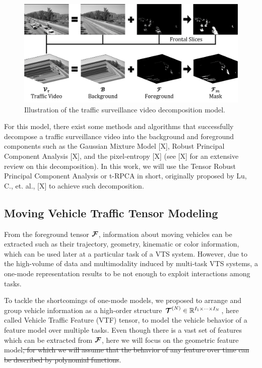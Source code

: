 \documentclass[sensors,article,submit,moreauthors,pdftex]{Definitions/mdpi}
\newcommand{\mathten}[1]{\boldsymbol{\mathbf{\mathcal{\MakeUppercase{#1}}}}}
\providecommand{\DIFdel}[1]{{\protect\color{red}\sout{#1}}}                      %
\providecommand{\DIFdelbegin}{} %
\providecommand{\DIFdelend}{} %
\begin{document}
\begin{figure}[H]
\centering
\includegraphics[width=14 cm]{images/traffic-model.png}
\caption{Illustration of the traffic surveillance video decomposition model.}
\label{fig:tsvmodel}
\end{figure}

For this model, there exist some methods and algorithms that successfully decompose a traffic surveillance video into the background and foreground components such as the Gaussian Mixture Model [X], Robust Principal Component Analysis [X], and the pixel-entropy [X] (see [X] for an extensive review on this decomposition). In this work, we will use the Tensor Robust Principal Component Analysis or t-RPCA in short, originally proposed by Lu, C., et. al., [X] to achieve such decomposition.

\subsection{Moving Vehicle Traffic Tensor Modeling}

From the foreground tensor $\mathten{F}$, information about moving vehicles can be extracted such as their trajectory, geometry, kinematic or color information, which can be used later at a particular task of a VTS system. However, due to the high-volume of data and multimodality induced by multi-task VTS systems, a one-mode representation results to be not enough to exploit interactions among tasks.

To tackle the shortcomings of one-mode models, we proposed to arrange and group vehicle information as a high-order structure $\mathten{T}^{(N)} \in \mathbb{R}^{I_1 \times \cdots \times I_N}$, here called Vehicle Traffic Feature (VTF) tensor, to model the vehicle behavior of a feature model over multiple tasks. Even though there is a vast set of features which can be extracted from $\mathten{F}$, here we will focus on the geometric feature model\DIFdelbegin \DIFdel{, for which we will assume that the behavior of any feature over time can be described by polynomial functions}\DIFdelend .
\end{document}
